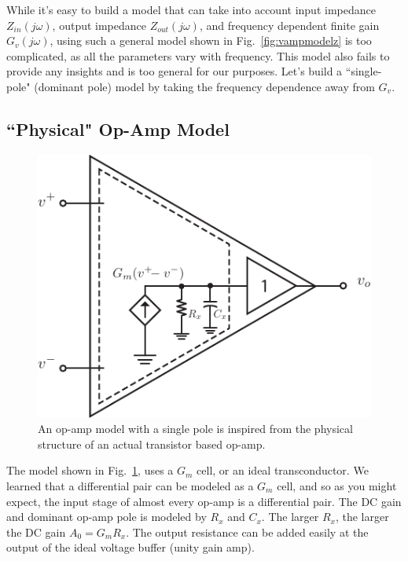 While it's easy to build a model that can take into account input impedance $Z_{in}(j\omega)$, output impedance $Z_{out}(j\omega)$, and frequency dependent finite gain $G_v(j\omega)$, using such a general model shown in Fig.~\ref{fig:vampmodelz} is too complicated, as all the parameters vary with frequency.  This model also fails to provide any insights and is too general for our purposes.  Let's build a ``single-pole" (dominant pole) model by taking the frequency dependence away from $G_v$.
 


\subsection{``Physical" Op-Amp Model}

\begin{figure}[tb]
\begin{center}
\includegraphics[scale=1]{opamp_model_pole}
\end{center}
\caption{An op-amp model with a single pole is inspired from the physical structure of an actual transistor based op-amp.} \label{fig:opamp_model_pole}
\end{figure}

The model shown in Fig.~\ref{fig:opamp_model_pole}, uses a $G_m$ cell, or an ideal transconductor.  We learned that a differential pair can be modeled as a $G_m$ cell, and so as you might expect, the input stage of almost every op-amp is a differential pair.  The DC gain and dominant op-amp pole is modeled by $R_x$ and $C_x$.  The larger $R_x$, the larger the DC gain $A_0 = G_m R_x$.  The output resistance can be added easily at the output of the ideal voltage buffer (unity gain amp).
 


